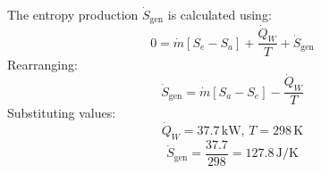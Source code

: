 The entropy production \( \dot{S}_{\text{gen}} \) is calculated using:  
\[
0 = \dot{m} [S_e - S_a] + \frac{\dot{Q}_W}{T} + \dot{S}_{\text{gen}}
\]  
Rearranging:  
\[
\dot{S}_{\text{gen}} = \dot{m} [S_a - S_e] - \frac{\dot{Q}_W}{T}
\]  
Substituting values:  
\[
\dot{Q}_W = 37.7 \, \text{kW}, \, T = 298 \, \text{K}
\]  
\[
\dot{S}_{\text{gen}} = \frac{37.7}{298} = 127.8 \, \text{J/K}
\]